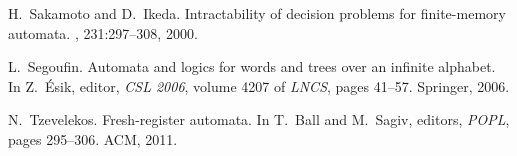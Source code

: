 \documentclass{LMCS}
\begin{document}
\begin{thebibliography}{10}
H.~Sakamoto and D.~Ikeda.
\newblock Intractability of decision problems for finite-memory automata.
, 231:297--308, 2000.

L.~Segoufin.
\newblock Automata and logics for words and trees over an infinite alphabet.
\newblock In Z.~{\'E}sik, editor, {\em CSL 2006}, volume 4207 of {\em LNCS},
  pages 41--57. Springer, 2006.

N.~Tzevelekos.
\newblock Fresh-register automata.
\newblock In T.~Ball and M.~Sagiv, editors, {\em POPL}, pages 295--306. ACM,
  2011.

\end{thebibliography}
\end{document}
